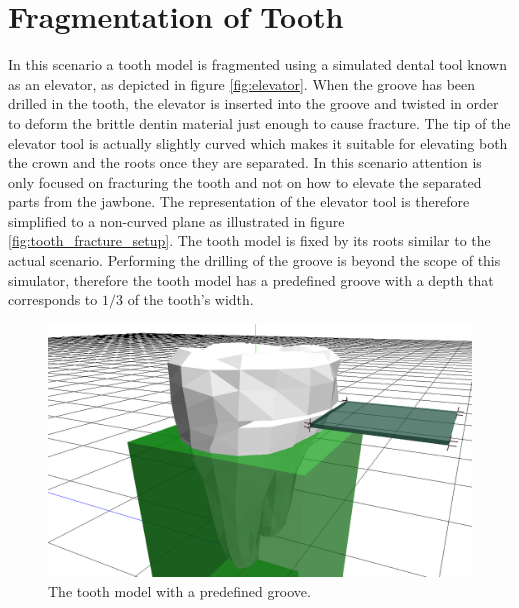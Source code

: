 \layoutnewpage

\section{Fragmentation of Tooth}
\label{sec:results_fragmentation_tooth}
In this scenario a tooth model is fragmented using a
simulated dental tool known as an elevator, as depicted
in figure \vref{fig:elevator}. When the
groove has been drilled in the 
tooth, the elevator is inserted into the groove and twisted in order
to deform the brittle dentin material just enough to cause
fracture. The tip of the elevator tool is actually slightly curved
which makes it suitable for elevating both the crown and the roots
once they are separated. In this scenario attention is only focused on fracturing the
tooth and not on how to elevate the separated parts from the
jawbone. The representation of the elevator tool is therefore
simplified to a non-curved plane as illustrated in figure
\vref{fig:tooth_fracture_setup}. The tooth model is fixed by its roots
similar to the actual scenario. Performing the drilling of the groove
is beyond the scope of this simulator, therefore the tooth model has a
predefined groove with a depth that corresponds to $1/3$ of the
tooth's width. 

\begin{figure}
    \centering
    \includegraphics[width=140mm]{./images/results_tooth_fracture_setup.png}
    \caption{The tooth model with a predefined groove.}
    \label{fig:tooth_fracture_setup}
\end{figure}

